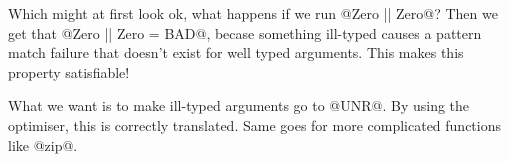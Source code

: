 Which might at first look ok, what happens if we run @Zero || Zero@?
Then we get that @Zero || Zero = BAD@, becase something ill-typed causes
a pattern match failure that doesn't exist for well typed arguments.
This makes this property satisfiable!

What we want is to make ill-typed arguments go to @UNR@. By using the
optimiser, this is correctly translated. Same goes for more complicated
functions like @zip@.
